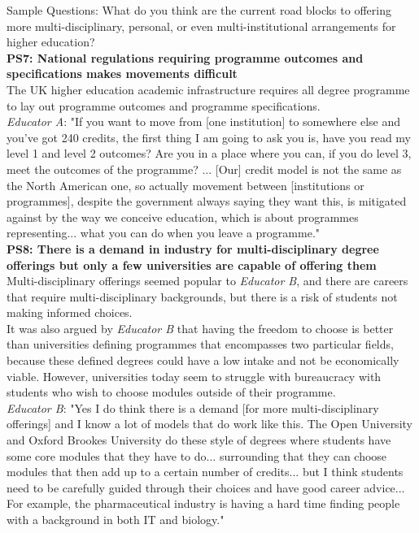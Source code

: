 Sample Questions: What do you think are the current road blocks to offering more multi-disciplinary, personal, 
or even multi-institutional arrangements for higher education?\vspace{0.25cm}\\
\textbf{PS7: National regulations requiring programme outcomes and specifications makes movements 
difficult}\\
The UK higher education academic infrastructure requires all degree programme to lay out 
programme outcomes and programme specifications.\\
\textit{Educator A}: "If you want to move from [one institution] to somewhere else and you’ve got 240 credits, 
the first thing I am going to ask you is, have you read my level 1 and level 2 outcomes? Are you 
in a place where you can, if you do level 3, meet the outcomes of the programme? ... 
[Our] credit model is not the same as the North American one, so actually movement 
between [institutions or programmes], despite the government always saying they want this, 
is mitigated against by the way we conceive education, which is about programmes representing... 
what you can do when you leave a programme."
\vspace{0.25cm}\\
\textbf{PS8: There is a demand in industry for multi-disciplinary degree offerings but only a few 
universities are capable of offering them}\\
Multi-disciplinary offerings seemed popular to \textit{Educator B}, and there are careers that require 
multi-disciplinary backgrounds, but there is a risk of students not making informed choices.\\
It was also argued by \textit{Educator B} that having the freedom to choose is better than universities 
defining programmes that encompasses two particular fields, because these defined degrees could have 
a low intake and not be economically viable. However, universities today seem to struggle with bureaucracy 
with students who wish to choose modules outside of their programme.\\
\textit{Educator B}: "Yes I do think there is a demand [for more multi-disciplinary offerings] and I know 
a lot of models that do work like this. The Open University and Oxford Brookes University do these 
style of degrees where students have some core modules that they have to do... surrounding that 
they can choose modules that then add up to a certain number of credits... but I think students 
need to be carefully guided through their choices and have good career advice... For example, 
the pharmaceutical industry is having a hard time finding people with a background in both IT and biology."

